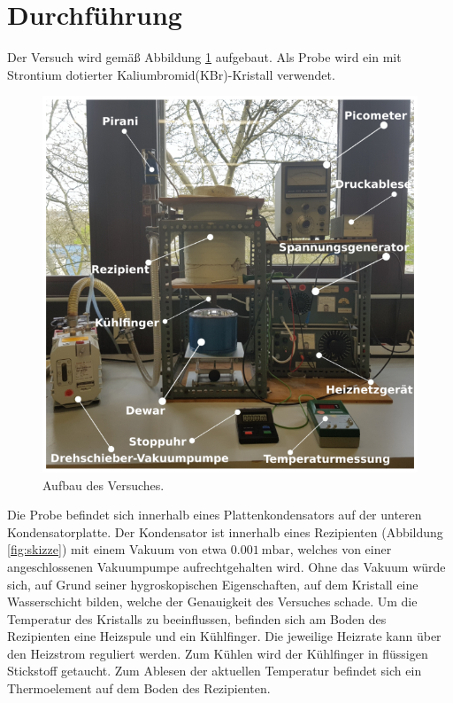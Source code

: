\section{Durchführung}
\label{sec:Durchführung}

Der Versuch wird gemäß Abbildung \ref{fig:aufbau} aufgebaut. Als Probe wird ein mit Strontium dotierter Kaliumbromid(KBr)-Kristall verwendet.

\begin{figure}
    \centering
    \includegraphics[width=\textwidth]{Bilder/Aufbau.PNG}
    \caption{Aufbau des Versuches.}
    \label{fig:aufbau}
\end{figure}

Die Probe befindet sich innerhalb eines Plattenkondensators auf der unteren Kondensatorplatte. Der Kondensator ist innerhalb eines Rezipienten (Abbildung \ref{fig:skizze}) mit einem Vakuum von etwa $\SI{0.001}{\milli\bar}$, welches von einer angeschlossenen Vakuumpumpe aufrechtgehalten wird. Ohne das Vakuum würde sich, auf Grund seiner hygroskopischen Eigenschaften, auf dem Kristall eine Wasserschicht bilden, welche der Genauigkeit des Versuches schade.
Um die Temperatur des Kristalls zu beeinflussen, befinden sich am Boden des Rezipienten eine Heizspule und ein Kühlfinger. Die jeweilige Heizrate kann über den Heizstrom reguliert werden. Zum Kühlen wird der Kühlfinger in flüssigen Stickstoff getaucht. Zum Ablesen der aktuellen Temperatur befindet sich ein Thermoelement auf dem Boden des Rezipienten. 


